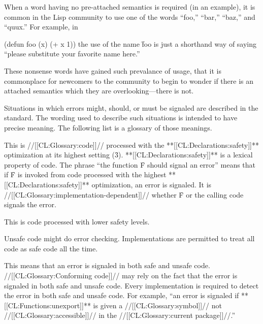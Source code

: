 When a word having no pre-attached semantics is required (\eg in an
example), it is common in the Lisp community to use one of the words
``foo,'' ``bar,'' ``baz,'' and ``quux.''  For example, in

\code
 (defun foo (x) (+ x 1))
\endcode
the use of the name \f{foo} is just a shorthand way of saying 
``please substitute your favorite name here.''

These nonsense words have gained such prevalance of usage, that it is
commonplace for newcomers to the community to begin to wonder if there
is an attached semantics which they are overlooking---there is not.

\endsubsubsection%

\endsubSection%





Situations in which errors might, should, or must be signaled are described
in the standard.  The wording used to describe such situations is intended
to have precise meaning. The following list is a glossary of those meanings.

\beginlist
{}

This is //[[CL:Glossary:code]]// processed with the **[[CL:Declarations:safety]]** optimization 
at its highest setting (\f{3}).  **[[CL:Declarations:safety]]** is a lexical property
of code.  The phrase ``the function \f{F} should signal an error'' 
means that if \f{F} is invoked from code processed with the highest
**[[CL:Declarations:safety]]** optimization, an error is signaled.
It is //[[CL:Glossary:implementation-dependent]]// whether \f{F} or the calling 
code signals the error.


This is code processed with lower safety levels.
		        
Unsafe code might do error checking.  Implementations are permitted to
treat all code as safe code all the time.
                        



%

This means that an error is signaled in both safe and unsafe code.
//[[CL:Glossary:Conforming code]]// may rely on the fact that the error is signaled
in both safe and unsafe code.  Every implementation is required to
detect the error in both safe and unsafe code. For example, ``an error
is signaled if **[[CL:Functions:unexport]]** is given a //[[CL:Glossary:symbol]]//
not //[[CL:Glossary:accessible]]// in the //[[CL:Glossary:current package]]//.''

